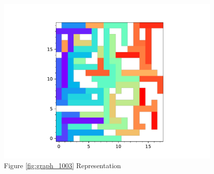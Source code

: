 \documentclass{standalone}
\begin{document}
\begin{figure}[!htb]
	\caption{Figure \ref{fig:graph_1003} Representation}
	\label{fig:picture_1003}
	\includegraphics[width=\textwidth]{../graphs/picture/1003.pdf}
\end{figure}
\end{document}

